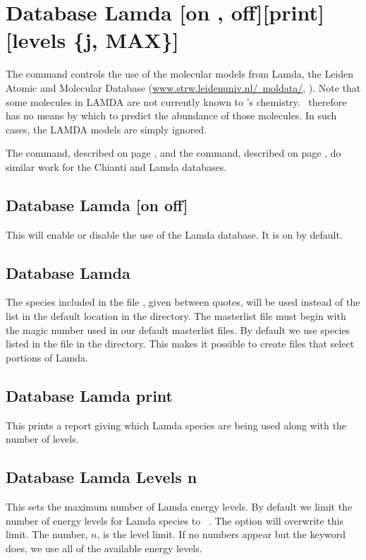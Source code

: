 \section{Database Lamda [on , off][print][levels \{j, MAX\}]}
\label{sec:SetLamda}
The command controls the use of the molecular models from Lamda, the Leiden Atomic and Molecular
Database (\href{http://www.strw.leidenuniv.nl/~moldata/}{www.strw.leidenuniv.nl/~moldata/}, 
\citet{Schoier.F05An-atomic-and-molecular-database-for-analysis}).   
Note that some molecules in LAMDA are not
currently known to \Cloudy 's chemistry.  \Cloudy\ therefore has no means by
which to predict the abundance of those molecules.  In such cases, the
LAMDA models are simply ignored. 

The  command, described on page \pageref{sec:SetChianti},
and the  command, described on page \pageref{sec:SetStout},
do similar work for the Chianti and Lamda databases.

\subsection{Database Lamda [on off]} 
This will enable or disable the use of the Lamda database.
It is on by default.

\subsection{Database Lamda }
The species included in the file , given between quotes, will be used
instead of the list in the default location in the  directory.
The masterlist file must begin with the magic number used in our default masterlist files.
By default we use species listed in the  file in the 
 directory.
This makes it possible to create  files that select portions of Lamda.

\subsection{Database Lamda print} 
This prints a report giving which Lamda species are being used
along with the number of levels.

\subsection{Database Lamda Levels n} 
This sets the maximum number of Lamda energy levels. 
By default we limit the number of energy levels for Lamda species to 
\nDefaultMolLevels\ .
The  option will overwrite this limit.
The number, $n$, is the level limit.
If no numbers appear but the keyword  does, we use all 
of the available energy levels.

